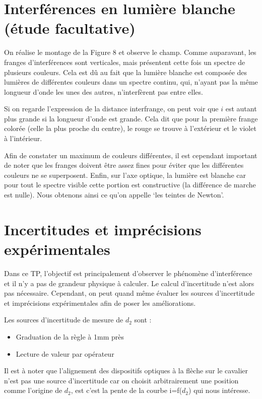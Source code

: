 \documentclass[11pt, a4paper]{article}
\begin{document}
\section{Interférences en lumière blanche (étude facultative)}
On réalise le montage de la Figure 8 et observe le champ. Comme auparavant, les franges d'interférences sont verticales, mais présentent cette fois un spectre de plusieurs couleurs. Cela est dû au fait que la lumière blanche est composée des lumières de différentes couleurs dans un spectre continu, qui, n'ayant pas la même longueur d'onde les unes des autres, n'interfèrent pas entre elles.

Si on regarde l'expression de la distance interfrange, on peut voir que $i$ est autant plus grande si la longueur d'onde est grande. Cela dit que pour la première frange colorée (celle la plus proche du centre), le rouge se trouve à l'extérieur et le violet à l'intérieur.

Afin de constater un maximum de couleurs différentes, il est cependant important de noter que les franges doivent être assez fines pour éviter que les différentes couleurs ne se superposent. Enfin, sur l'axe optique, la lumière est blanche car pour tout le spectre visible cette portion est constructive (la différence de marche est nulle). Nous obtenons ainsi ce qu'on appelle ‘les teintes de Newton'.

\section{Incertitudes et imprécisions expérimentales}
Dans ce TP, l'objectif est principalement d'observer le phénomène d'interférence et il n'y a pas de grandeur physique à calculer. Le calcul d'incertitude n'est alors pas nécessaire. Cependant, on peut quand même évaluer les sources d'incertitude et imprécisions expérimentales afin de poser les améliorations.

Les sources d'incertitude de mesure de $d_2$ sont :
\begin{itemize}
    \item Graduation de la règle à 1mm près
    \item Lecture de valeur par opérateur
\end{itemize}

Il est à noter que l'alignement des dispositifs optiques à la flèche sur le cavalier n'est pas une source d'incertitude car on choisit arbitrairement une position comme l'origine de $d_2$, est c'est la pente de la courbe i=f($d_2$) qui nous intéresse.
\end{document}
